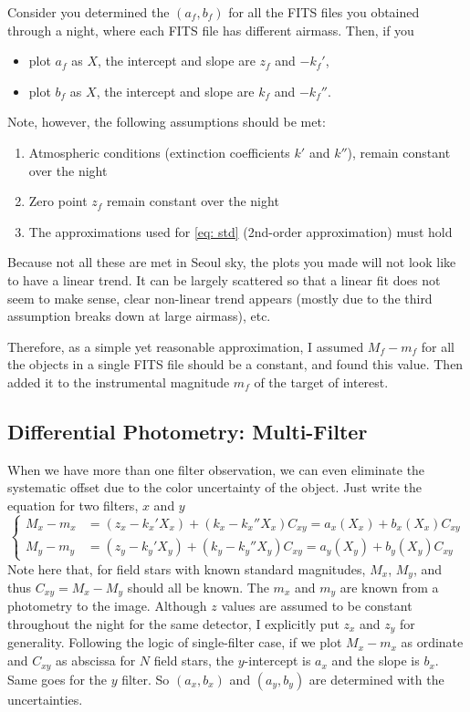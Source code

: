Consider you determined the $ (a_f, b_f) $ for all the FITS files you obtained through a night, where each FITS file has different airmass. Then, if you 
\begin{itemize}
\item plot $ a_f $ as $ X $, the intercept and slope are $ z_f $ and $ -k_f' $,
\item plot $ b_f $ as $ X $, the intercept and slope are $ k_f $ and $ -k_f'' $.
\end{itemize}

Note, however, the following assumptions should be met: 
\begin{enumerate}
\item Atmospheric conditions (extinction coefficients $ k' $ and $ k'' $), remain constant over the night 
\item Zero point $ z_f $ remain constant over the night 
\item The approximations used for \cref{eq: std} (2nd-order approximation) must hold
\end{enumerate}

Because not all these are met in Seoul sky, the plots you made will not look like to have a linear trend. It can be largely scattered so that a linear fit does not seem to make sense, clear non-linear trend appears (mostly due to the third assumption breaks down at large airmass), etc.

Therefore, as a simple yet reasonable approximation, I assumed $ M_f - m_f $ for all the objects in a single FITS file should be a constant, and found this value. Then added it to the instrumental magnitude $ m_f $ of the target of interest.


\subsection{Differential Photometry: Multi-Filter}
When we have more than one filter observation, we can even eliminate the systematic offset due to the color uncertainty of the object. Just write the equation for two filters, $ x $ and $ y $
\begin{equation}
\begin{cases}
  M_x - m_x &= (z_x - k_x' X_x) + (k_x - k_x''X_x) C_{xy} = a_x(X_x) + b_x(X_x) C_{xy} \\
  M_y - m_y &= (z_y - k_y' X_y) + (k_y - k_y''X_y) C_{xy} = a_y(X_y) + b_y(X_y) C_{xy} 
\end{cases}
\end{equation}
Note here that, for field stars with known standard magnitudes, $ M_x $, $ M_y $, and thus $ C_{xy} = M_x - M_y $ should all be known. The $ m_x $ and $ m_y $ are known from a photometry to the image. Although $ z $ values are assumed to be constant throughout the night for the same detector, I explicitly put $ z_x $ and $ z_y $ for generality. Following the logic of single-filter case, if we plot $ M_x - m_x $ as ordinate and $ C_{xy} $ as abscissa for $ N $ field stars, the $ y $-intercept is $ a_x $ and the slope is $ b_x $. Same goes for the $ y $ filter. So  $ (a_x, b_x) $ and $ (a_y, b_y) $ are determined with the uncertainties.

